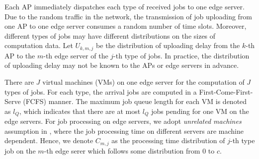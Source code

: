 Each AP immediately dispatches each type of received jobs to one edge server.
Due to the random traffic in the network, the transmission of job uploading from one AP to one edge server consumes a random number of time slots. Moreover, different types of jobs may have different distributions on the sizes of computation data.
Let $U_{k,m,j}$ be the distribution of uploading delay from the $k$-th AP to the $m$-th edge server of the $j$-th type of jobs.
In practice, the distribution of uploading delay may not be known to the APs or edge servers in advance.

There are $J$ virtual machines (VMs) on one edge server for the computation of $J$ types of jobs.
For each type, the arrival jobs are computed in a First-Come-First-Serve (FCFS) manner.
The maximum job queue length for each VM is denoted as $l_Q$, which indicates that there are at most $l_Q$ jobs pending for one VM on the edge servers. 
For job processing on edge servers, we adopt \emph{unrelated machines} assumption in \cite{tan-online}, where the job processing time on different servers are machine dependent. %
Hence, we denote $C_{m,j}$ as the processing time distribution of $j$-th type job on the $m$-th edge serer which follows some distribution from $0$ to $c$.

